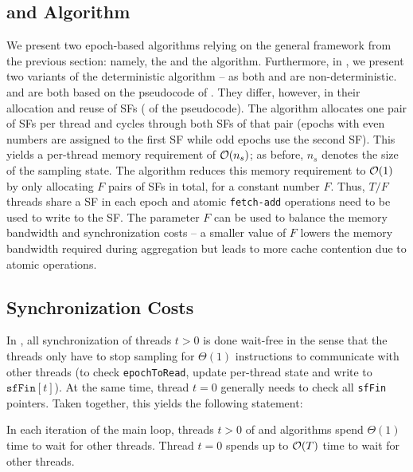 \subsection{\Localframe and \sharedframe Algorithm}
We present two epoch-based algorithms relying on the general framework from the
previous section: namely, the \localframe and the \sharedframe
algorithm.
Furthermore, in
,
we present two variants of the deterministic \indexedframe algorithm -- as both
\localframe and \sharedframe are non-deterministic.
\Localframe and \sharedframe are both based on the pseudocode of
. They differ, however, in their allocation
and reuse of SFs ( of the pseudocode).
The \localframe algorithm allocates one pair of SFs per thread and cycles
through both SFs of that pair (\ie epochs with even numbers are assigned
to the first SF while odd epochs use the second SF).
%
This yields a per-thread memory requirement of $\mathcal{O}(n_s)$; as before, $n_s$ denotes
the size of the sampling state. The \sharedframe algorithm reduces this memory
requirement to $\mathcal{O}(1)$ by only allocating $F$ pairs of SFs in total, for a
constant number $F$. Thus, $T/F$ threads share a SF in each epoch and atomic
\texttt{fetch-add} operations need to be used to write to the SF. The parameter
$F$ can be used to balance the memory bandwidth and synchronization costs -- a
smaller value of $F$ lowers the memory bandwidth required during aggregation
but leads to more cache contention due to atomic operations.

\subsection{Synchronization Costs}
\label{sec:betw-apx:sync-costs}
%
In , all synchronization of threads
$t > 0$ is done wait-free in the sense that the threads only have to
stop sampling for $\Theta(1)$ instructions to communicate with other threads
(\ie to check \texttt{epochToRead}, update per-thread state and
write to $\mathtt{sfFin}[t]$).
At the same time, thread $t = 0$ generally needs to check all \texttt{sfFin}
pointers. Taken together, this yields the following statement:

\begin{proposition}
In each iteration of the main loop, threads $t > 0$ of \localframe and
\sharedframe algorithms spend $\Theta(1)$ time to wait for other threads.
Thread $t = 0$ spends up to $\mathcal{O}(T)$ time to wait for other threads.
\end{proposition}

